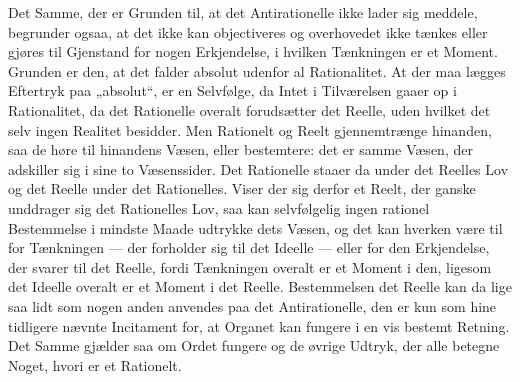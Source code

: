 Det Samme, der er Grunden til, at det Antirationelle ikke lader sig meddele,
begrunder ogsaa, at det ikke kan objectiveres og overhovedet ikke tænkes
eller gjøres til Gjenstand for nogen Erkjendelse, i hvilken
Tænkningen er et Moment. Grunden er den, at det falder absolut udenfor al
Rationalitet. At der maa lægges Eftertryk paa „absolut“, er en Selvfølge, da
Intet i Tilværelsen gaaer op i Rationalitet, da det Rationelle overalt
forudsætter det Reelle, uden hvilket det selv ingen Realitet besidder. Men
Rationelt og Reelt gjennemtrænge hinanden, saa de høre til hinandens Væsen,
eller bestemtere: det er samme Væsen, der adskiller sig i sine to Væsenssider.
Det Rationelle staaer da under det Reelles Lov og det Reelle under det
Rationelles. Viser der sig derfor et Reelt, der ganske unddrager sig det
Rationelles Lov, saa kan selvfølgelig ingen rationel Bestemmelse i mindste
Maade udtrykke dets Væsen, og det kan hverken være til for Tænkningen --- der
forholder sig til det Ideelle --- eller for den Erkjendelse, der svarer til det
Reelle, fordi Tænkningen overalt er et Moment i den, ligesom det Ideelle
overalt er et Moment i det Reelle. Bestemmelsen det Reelle kan da lige saa lidt
som nogen anden anvendes paa det Antirationelle, den er kun som hine tidligere
nævnte Incitament for, at Organet kan fungere i en vis bestemt Retning. Det
Samme gjælder saa om Ordet fungere og de øvrige Udtryk, der alle betegne Noget,
hvori er et Rationelt.

